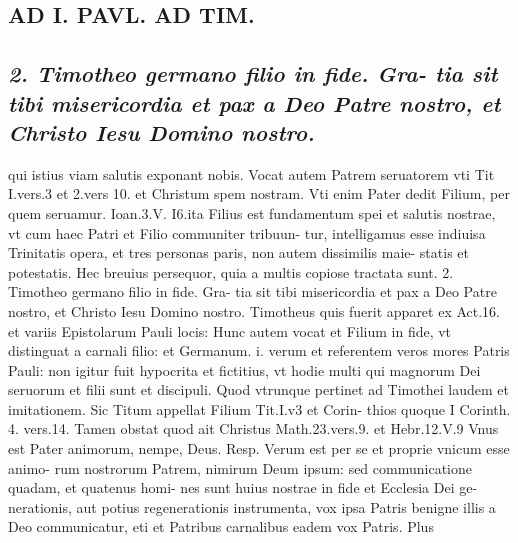 \documentclass{article}
\begin{document}
\begin{pages}
\section*{AD I. PAVL. AD TIM. }
\marginpar{[ p.4 ]}\pstart {}
{}
\subsection*{\textit{2. Timotheo germano filio in fide. Gra- tia sit tibi misericordia et pax a Deo Patre nostro, et Christo Iesu Domino nostro.}}qui istius viam salutis exponant nobis. Vocat autem Patrem seruatorem vti Tit I.vers.3 et 2.vers 10. et Christum spem nostram. Vti enim Pater dedit Filium, per quem seruamur. Ioan.3.V. I6.ita Filius est fundamentum spei et salutis nostrae, vt cum haec Patri et Filio communiter tribuun- tur, intelligamus esse indiuisa Trinitatis opera, et tres personas paris, non autem dissimilis maie- statis et potestatis. Hec breuius persequor, quia a multis copiose tractata sunt. 2. Timotheo germano filio in fide. Gra- tia sit tibi misericordia et pax a Deo Patre nostro, et Christo Iesu Domino nostro. Timotheus quis fuerit apparet ex Act.16. et variis Epistolarum Pauli locis: Hunc autem vocat et Filium in fide, vt distinguat a carnali filio: et Germanum. i. verum et referentem veros mores Patris Pauli: non igitur fuit hypocrita et fictitius, vt hodie multi qui magnorum Dei seruorum et filii sunt et discipuli. Quod vtrunque pertinet ad Timothei laudem et imitationem. Sic Titum appellat Filium Tit.I.v3 et Corin- thios quoque I Corinth. 4. vers.14. Tamen obstat quod ait Christus Math.23.vers.9. et Hebr.12.V.9 Vnus est Pater animorum, nempe, Deus. Resp. Verum est per se et proprie vnicum esse animo- rum nostrorum Patrem, nimirum Deum ipsum: sed communicatione quadam, et quatenus homi- nes sunt huius nostrae in fide et Ecclesia Dei ge- nerationis, aut potius regenerationis instrumenta, vox ipsa Patris benigne illis a Deo communicatur, eti et Patribus carnalibus eadem vox Patris. Plus  \pend

\end{pages}
\end{document}
